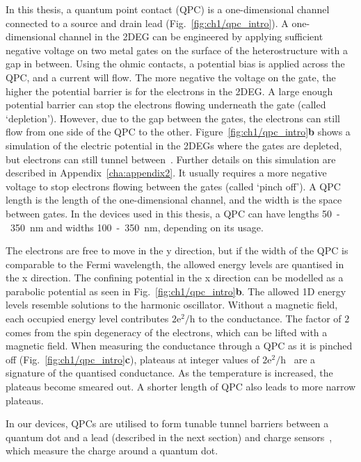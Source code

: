 In this thesis, a quantum point contact (QPC) is a one-dimensional channel connected to a source and drain lead (Fig.~\ref{fig:ch1/qpc_intro}). A one-dimensional channel in the 2DEG can be engineered by applying sufficient negative voltage on two metal gates on the surface of the heterostructure with a gap in between. Using the ohmic contacts, a potential bias is applied across the QPC, and a current will flow. The more negative the voltage on the gate, the higher the potential barrier is for the electrons in the 2DEG. A large enough potential barrier can stop the electrons flowing underneath the gate (called `depletion'). However, due to the gap between the gates, the electrons can still flow from one side of the QPC to the other. Figure~\ref{fig:ch1/qpc_intro}\textbf{b} shows a simulation of the electric potential in the 2DEGs where the gates are depleted, but electrons can still tunnel between~\cite{Davies1995}. Further details on this simulation are described in Appendix~\ref{cha:appendix2}. It usually requires a more negative voltage to stop electrons flowing between the gates (called `pinch off'). A QPC length is the length of the one-dimensional channel, and the width is the space between gates. In the devices used in this thesis, a QPC can have lengths 50~-~\qty{350}{nm} and widths 100~-~\qty{350}{nm}, depending on its usage.

The electrons are free to move in the y direction, but if the width of the QPC is comparable to the Fermi wavelength, the allowed energy levels are quantised in the x direction. The confining potential in the x direction can be modelled as a parabolic potential as seen in Fig.~\ref{fig:ch1/qpc_intro}\textbf{b}. The allowed 1D energy levels resemble solutions to the harmonic oscillator. Without a magnetic field, each occupied energy level contributes $\mathrm{2e^2/h}$ to the conductance. The factor of $2$ comes from the spin degeneracy of the electrons, which can be lifted with a magnetic field. When measuring the conductance through a QPC as it is pinched off (Fig.~\ref{fig:ch1/qpc_intro}\textbf{c}), plateaus at integer values of $\mathrm{2e^2/h}$~\cite{qpc_first_measurement} are a signature of the quantised conductance. 
As the temperature is increased, the plateaus become smeared out. A shorter length of QPC also leads to more narrow plateaus.


In our devices, QPCs are utilised to form tunable tunnel barriers between a quantum dot and a lead (described in the next section) and charge sensors~\cite{cs_first_measurement}, which measure the charge around a quantum dot. 




